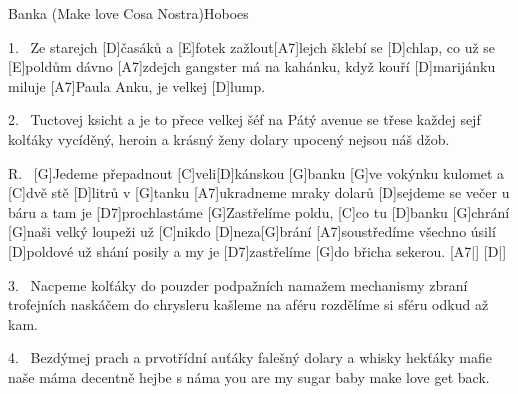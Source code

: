 \begin{song}{Banka (Make love Cosa Nostra)}{Hoboes}

\begin{xverse}{1.~}
Ze starejch [D]{}časáků a [E]fotek zažlout[A7]lejch
šklebí se [D]chlap, co už se [E]poldům dávno [A7]zdejch
gangster má na kahánku, když kouří [D]marijánku
miluje [A7]Paula Anku, je velkej [D]lump.
\end{xverse}

\begin{xverse}{2.~}
Tuctovej ksicht a je to přece velkej šéf
na Pátý avenue se třese každej sejf
kolťáky vycíděný, heroin a krásný ženy
dolary upocený nejsou náš džob.
\end{xverse}

\begin{xverse}{R.~}
[G]Jedeme přepadnout [C]veli[D]kánskou [G]banku
[G]ve vokýnku kulomet a [C]dvě stě [D]litrů v [G]tanku
[A7]ukradneme mraky dolarů
[D]sejdeme se večer u báru a tam je [D7]prochlastáme
[G]Zastřelíme poldu, [C]co tu [D]banku [G]chrání
[G]naši velký loupeži už [C]nikdo [D]neza[G]brání
[A7]soustředíme všechno úsilí
[D]poldové už shání posily a my je [D7]zastřelíme
[G]do břicha sekerou. [A7|]{} [D|]{}
\end{xverse}


\begin{xverse}{3.~}
Nacpeme kolťáky do pouzder podpažních
namažem mechanismy zbraní trofejních
naskáčem do chrysleru kašleme na aféru
rozdělíme si sféru odkud až kam.
\end{xverse}


\begin{xverse}{4.~}
Bezdýmej prach a prvotřídní auťáky
falešný dolary a whisky hekťáky
mafie naše máma decentně hejbe s náma
you are my sugar baby make love get back.
\end{xverse}


\end{song}


